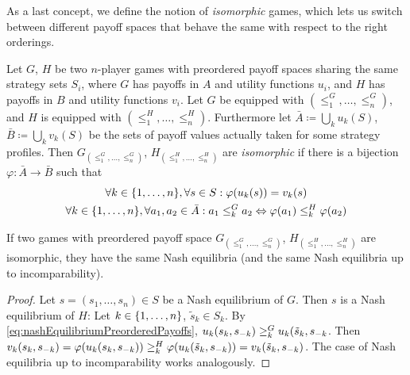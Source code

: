 \documentclass[a4paper]{scrreprt}
\let\phi\varphi
\begin{document}
    As a last concept, we define the notion of \emph{isomorphic} games, which lets us switch between different payoff spaces that behave the same with respect to the right orderings.
    \begin{defn}
        Let $G$, $H$ be two $n$-player games with preordered payoff spaces sharing the same strategy sets $S_i$, where $G$ has payoffs in $A$ and utility functions $u_i$,
        and $H$ has payoffs in $B$ and utility functions $v_i$.
        Let $G$ be equipped with $(\leq_1^G, \dots, \leq_n^G)$, and $H$ is equipped with $(\leq_1^H, \dots, \leq_n^H)$.
        Furthermore let $\bar{A} \coloneqq \bigcup_k u_k(S)$, $\bar{B} \coloneqq \bigcup_k v_k(S)$ be the sets of payoff values actually taken for some strategy profiles.
        Then $G_{(\leq_1^G, \dots, \leq_n^G)}$, $H_(\leq_1^H, \dots, \leq_n^H)$
        are \emph{isomorphic} if there is a bijection $\phi: \bar{A} \to \bar{B}$ such that
        \begin{gather}
            \forall k \in \set{1, \dots, n}, \forall s \in S: \phi(u_k(s)) = v_k(s) \\
            \forall k \in \set{1, \dots, n}, \forall a_1, a_2 \in \bar{A}: a_1 \leq_k^G a_2 \lra \phi(a_1) \leq_k^H \phi(a_2)
        \end{gather}
    \end{defn}
    
    \begin{lemma}
        If two games with preordered payoff space $G_{(\leq_1^G, \dots, \leq_n^G)}$, $H_{(\leq_1^H, \dots, \leq_n^H)}$ are isomorphic,
        they have the same Nash equilibria (and the same Nash equilibria up to incomparability).
    \end{lemma}
    \begin{proof}
        Let $s = (s_1, \dots, s_n) \in S$ be a Nash equilibrium of $G$.
        Then $s$ is a Nash equilibrium of $H$: Let $k \in \{1, \dots, n\}$, $\tilde{s}_k \in S_k$.
        By \eqref{eq:nashEquilibriumPreorderedPayoffs}, $u_k(s_k, s_{-k}) \geq_k^G u_k(\tilde{s}_k, s_{-k}$.
        Then $v_k(s_k, s_{-k}) = \phi(u_k(s_k, s_{-k})) \popref_k^H \phi(u_k(\tilde{s}_k, s_{-k})) = v_k(\tilde{s}_k, s_{-k})$.
        The case of Nash equilibria up to incomparability works analogously.
    \end{proof}
    
\end{document}

